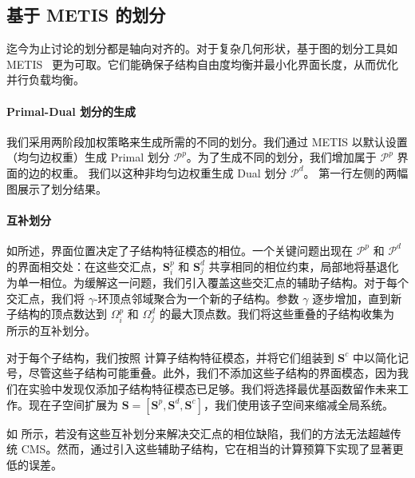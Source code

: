 \subsection{基于 METIS 的划分}\label{sec:metis-partition}
迄今为止讨论的划分都是轴向对齐的。对于复杂几何形状，基于图的划分工具如 METIS~\cite{Karypis1997METIS} 更为可取。它们能确保子结构自由度均衡并最小化界面长度，从而优化并行负载均衡。

\paragraph{Primal-Dual 划分的生成}
我们采用两阶段加权策略来生成所需的不同的划分。我们通过 METIS 以默认设置（均匀边权重）生成 Primal 划分 $\mathcal{P}^p$。为了生成不同的划分，我们增加属于 $\mathcal{P}^p$ 界面的边的权重。
我们以这种非均匀边权重生成 Dual 划分 $\mathcal{P}^d$。 第一行左侧的两幅图展示了划分结果。

\paragraph{互补划分}
如所述，界面位置决定了子结构特征模态的相位。一个关键问题出现在 $\mathcal{P}^p$ 和 $\mathcal{P}^d$ 的界面相交处：在这些交汇点，$\mathbf{S}_i^p$ 和 $\mathbf{S}^d_j$ 共享相同的相位约束，局部地将基退化为单一相位。为缓解这一问题，我们引入覆盖这些交汇点的辅助子结构。对于每个交汇点，我们将 $\gamma$-环顶点邻域聚合为一个新的子结构。参数 $\gamma$ 逐步增加，直到新子结构的顶点数达到 $\Omega_i^p$ 和 $\Omega_j^d$ 的最大顶点数。我们将这些重叠的子结构收集为 所示的互补划分。

对于每个子结构，我们按照 计算子结构特征模态，并将它们组装到 $\mathbf{S}^c$ 中以简化记号，尽管这些子结构可能重叠。此外，我们不添加这些子结构的界面模态，因为我们在实验中发现仅添加子结构特征模态已足够。我们将选择最优基函数留作未来工作。现在子空间扩展为 $\mathbf{S} =
[\mathbf{S}^p, \mathbf{S}^d, \mathbf{S}^c]$，我们使用该子空间来缩减全局系统。

如 所示，若没有这些互补划分来解决交汇点的相位缺陷，我们的方法无法超越传统 CMS。然而，通过引入这些辅助子结构，它在相当的计算预算下实现了显著更低的误差。
